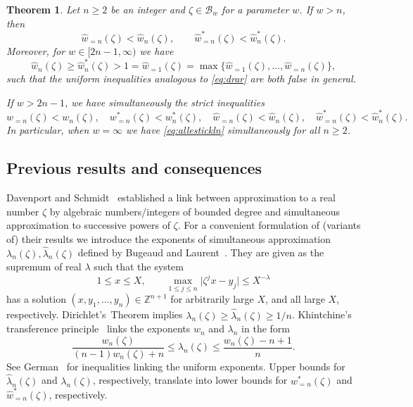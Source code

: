 \documentclass[12pt]{amsart}
\newtheorem{theorem}{Theorem}[section]
\theoremstyle{definition}
\begin{document}
\begin{theorem} \label{ce}
Let $n\geq 2$ be an integer and $\zeta\in\mathscr{B}_{w}$ for a parameter $w$. 
If $w>n$, then 
%
\begin{equation} \label{eq:lucia}
\widehat{w}_{=n}(\zeta)<\widehat{w}_{n}(\zeta), \qquad
\widehat{w}_{=n}^{\ast}(\zeta)<\widehat{w}_{n}^{\ast}(\zeta).
\end{equation}
%
Moreover, for $w\in[2n-1,\infty)$ we have
%
\begin{equation} \label{eq:bleiben}
\widehat{w}_{n}(\zeta)\geq \widehat{w}_{n}^{\ast}(\zeta) > 1 = \widehat{w}_{=1}(\zeta)= \max\{ \widehat{w}_{=1}(\zeta),\ldots, \widehat{w}_{=n}(\zeta)\},
\end{equation}
%
such that the uniform inequalities  analogous
to \eqref{eq:drar} are both false in general.

If $w>2n-1$, we have simultaneously the strict inequalities
%
\begin{equation} \label{eq:allestickln}
w_{=n}(\zeta)<w_{n}(\zeta), \quad w_{=n}^{\ast}(\zeta)<w_{n}^{\ast}(\zeta), \quad  
\widehat{w}_{=n}(\zeta)<\widehat{w}_{n}(\zeta), \quad \widehat{w}_{=n}^{\ast}(\zeta)<\widehat{w}_{n}^{\ast}(\zeta).
\end{equation}
%
In particular, when $w=\infty$ we have
\eqref{eq:allestickln} simultaneously for all $n\geq 2$.
\end{theorem} 


\subsection{Previous results and consequences}

Davenport and Schmidt~\cite{davsh} established a link 
between approximation to a real number $\zeta$ by
algebraic numbers/integers of bounded degree and simultaneous
approximation to successive powers of $\zeta$. For a convenient
formulation of (variants of) their results 
we introduce the exponents of simultaneous 
approximation $\lambda_{n}(\zeta), \widehat{\lambda}_{n}(\zeta)$
defined by Bugeaud and Laurent~\cite{buglaur}. 
They are given as the supremum of real $\lambda$
such that the system
%
\[
1\leq x\leq X, \qquad \max_{1\leq j\leq n} \vert \zeta^{j}x-y_{j} \vert \leq X^{-\lambda}
\]
%
has a solution $(x,y_{1},\ldots,y_{n})\in\mathbb{Z}^{n+1}$ for 
arbitrarily large $X$, and all large $X$, respectively. Dirichlet's~Theorem
implies $\lambda_{n}(\zeta)\geq \widehat{\lambda}_{n}(\zeta)\geq 1/n$.
Khintchine's transference principle~\cite{khint} links the exponents $w_{n}$ and $\lambda_{n}$ in the form
%
\begin{equation} \label{eq:kinschin}
\frac{w_{n}(\zeta)}{(n-1)w_{n}(\zeta)+n}\leq \lambda_{n}(\zeta)\leq \frac{w_{n}(\zeta)-n+1}{n}.
\end{equation}
%
See German~\cite{ogerman} for inequalities linking the uniform exponents.
Upper bounds 
for $\widehat{\lambda}_{n}(\zeta)$ and $\lambda_{n}(\zeta)$, respectively,
translate into lower bounds for 
$w_{=n}^{\ast}(\zeta)$ and $\widehat{w}_{=n}^{\ast}(\zeta)$, respectively. 
\end{document}
